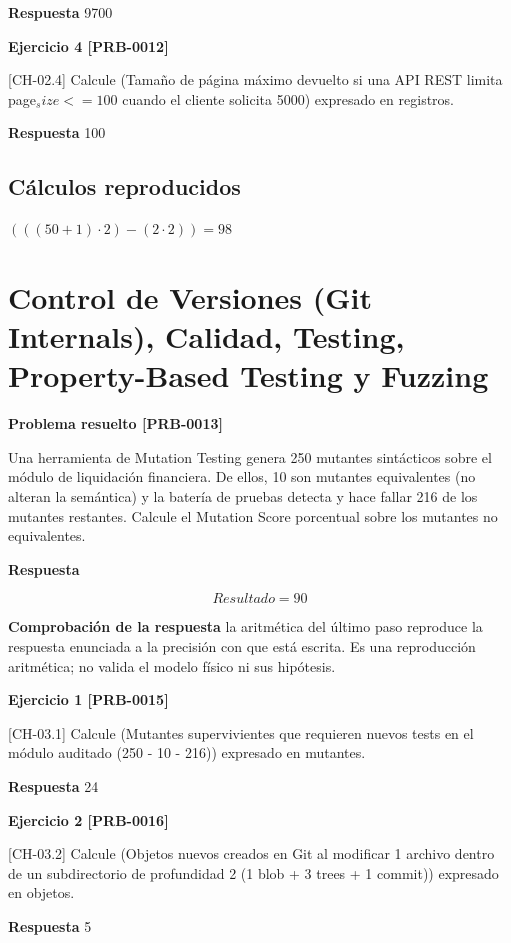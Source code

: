 \documentclass{book}
\begin{document}
\noindent\textbf{Respuesta} 9700

\noindent\textbf{Ejercicio 4 [PRB-0012]}

[CH-02.4] Calcule (Tamaño de página máximo devuelto si una API REST limita page\(_size <= 100\) cuando el cliente solicita 5000) expresado en registros.

\noindent\textbf{Respuesta} 100

\subsection*{Cálculos reproducidos}

\(\left(\left(\left(50+1\right)\cdot 2\right)-\left(2\cdot 2\right)\right) = 98\)

\section{Control de Versiones (Git Internals), Calidad, Testing, Property-Based Testing y Fuzzing}

\noindent\textbf{Problema resuelto [PRB-0013]}

Una herramienta de Mutation Testing genera 250 mutantes sintácticos sobre el módulo de liquidación financiera. De ellos, 10 son mutantes equivalentes (no alteran la semántica) y la batería de pruebas detecta y hace fallar 216 de los mutantes restantes. Calcule el Mutation Score porcentual sobre los mutantes no equivalentes.

\noindent\textbf{Respuesta}

\[
Resultado = 90
\]

\noindent\textbf{Comprobación de la respuesta} la aritmética del último paso reproduce la respuesta enunciada a la precisión con que está escrita. Es una reproducción aritmética; no valida el modelo físico ni sus hipótesis.

\noindent\textbf{Ejercicio 1 [PRB-0015]}

[CH-03.1] Calcule (Mutantes supervivientes que requieren nuevos tests en el módulo auditado (250 - 10 - 216)) expresado en mutantes.

\noindent\textbf{Respuesta} 24

\noindent\textbf{Ejercicio 2 [PRB-0016]}

[CH-03.2] Calcule (Objetos nuevos creados en Git al modificar 1 archivo dentro de un subdirectorio de profundidad 2 (1 blob + 3 trees + 1 commit)) expresado en objetos.

\noindent\textbf{Respuesta} 5
\end{document}
